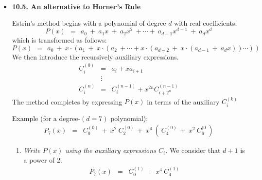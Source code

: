 \begin{itemize}
\item {\bf 10.5. An alternative to Horner's Rule}

\smallskip


Estrin's method begins with a polynomial of degree $d$ with real coefficients:
\[
P(x) \ \ = \ \ a_0 \ + \ a_1 x \ + \ a_2 x^2 \ + \cdots + \ a_{d-1} x^{d-1} \ + \ a_d x^d
\]
which is transformed as follows:
\[
P(x) \ \ = \ \ a_0 \ + \ x \cdot (a_1 \ + \ x \cdot (a_2  \ +  \cdots                                          
+ x \cdot (a_{d-2} \ + \ x \cdot (a_{d-1} \ + \ a_d x)) \cdots ))
\]
We then introduce the recursively auxiliary expressions.  
\begin{eqnarray*}
C_i^{(0)} & = & a_i + x a_{i+1} \\
                &\vdots &  \\
C_i^{(n)}  & = & C_i^{(n-1)} + x^{2n} C_{i+2^n}^{(n-1)}
\end{eqnarray*}
The method completes by expressing $P(x)$ in terms of the auxiliary $C_i^{(k)}$
\smallskip

Example (for a degree-$(d=7)$ polynomial):
\begin{eqnarray*}
P_7(x) & = & C_{0}^{(0)} \ + \ x^2 \ C_2^{(0)} \ + \ x^4 \ ( \ C_4^{(0)} \ + \ x^2 \ C_6^{(0} \ )
\end{eqnarray*}
\medskip

\begin{enumerate}
\item
{\em Write $P(x)$ using the auxiliary expressions $C_i$.}  
We consider that $d+1$ is a power of $2$.
\begin{eqnarray*}
P_7(x)            & = & C_0^{(1)} \ + \ x^4 \ C_4^{(1)}
\end{eqnarray*}


\end{enumerate}
\end{itemize}

